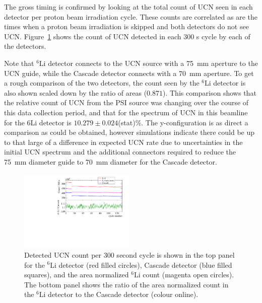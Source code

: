 \documentclass[letter,twocolumn,preprint,3p]{elsarticle}
\begin{document}
The gross timing is confirmed by looking at the total count of UCN
seen in each detector per proton beam irradiation cycle.  These counts
are correlated as are the times when a proton beam irradiation is
skipped and both detectors do not see UCN.
Figure~\ref{fig:ratecompare} shows the count of UCN detected in each
300 s cycle by each of the detectors.

Note that $^{6}$Li detector connects to the UCN source with a 75~mm
aperture to the UCN guide, while the Cascade detector connects with a
70~mm aperture.  To get a rough comparison of the two detectors, the
count seen by the $^{6}$Li detector is also shown scaled down by the
ratio of areas ($0.871$).  This comparison shows that the relative
count of UCN from the PSI source was changing over the course of this
data collection period, and that for the spectrum of UCN in this
beamline for the ${6}$Li detector is $10.279 \pm 0.024$(stat)\%.  The
y-configuration is as direct a comparison as could be obtained,
however simulations indicate there could be up to that large of a
difference in expected UCN rate due to uncertainties in the initial
UCN spectrum and the additional connectors required to reduce the
75~mm diameter guide to 70~mm diameter for the Cascade detector.

\begin{figure}[!htpb]
\centering \includegraphics[width=0.49\textwidth]{figures/cascade_to_li_ratecompare.pdf}
\caption{Detected UCN count per 300 second cycle is shown in the top
  panel for the ${^6}$Li detector (red filled circles), Cascade
  detector (blue filled squares), and the area normalized ${^6}$Li
  count (magenta open circles).  The bottom panel shows the ratio of
  the area normalized count in the $^{6}$Li detector to the Cascade
  detector (colour online).}
\label{fig:ratecompare}
\end{figure}
\end{document}
